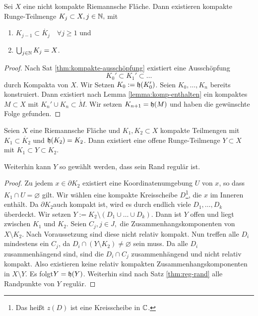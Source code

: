 \begin{cor}
  \label{cor:ausschöpfung-kompakt}
  Sei $X$ eine nicht kompakte Riemannsche Fläche. Dann existieren
  kompakte Runge-Teilmenge $K_j \subset X, j \in \mathbb{N},$ mit
  \begin{enumerate}
  \item $K_{j-1} \subset \mathring{K_j} \quad \forall j \geq 1$ und
  \item $\bigcup_{j\in \mathbb{N}} K_j = X$.
  \end{enumerate}
\end{cor}

\begin{proof}
  Nach Sat \ref{thm:kompakte-ausschöpfung} existiert eine 
  Ausschöpfung
  \[
  K_0' \subset K_1' \subset \dots
  \]
  durch Kompakta von $X$. Wir Setzen $K_0 := \mathfrak{h}(K_0')$. Seien
  $K_0, \dots, K_n$ bereits konstruiert. Dann existiert nach Lemma
  \ref{lemma:komp-enthalten} ein
  kompaktes $M \subset X$ mit $K_n' \cup K_n \subset \mathring
  M$. Wir setzen $K_{n+1} = \mathfrak{h}(M)$ und haben die gewünschte Folge
  gefunden.
\end{proof}

\begin{lemma}
  \label{lemma:zwischen-runge}
  Seien $X$ eine Riemannsche Fläche und $K_1, K_2 \subset X$ kompakte
  Teilmengen mit $K_1 \subset \mathring{K_2}$ und $\mathfrak{h}(K_2) =
  K_2$. Dann existiert eine offene Runge-Teilmenge $Y \subset X$ mit
  $K_1 \subset Y \subset K_2$.

  Weiterhin kann $Y$ so gewählt werden, dass sein Rand regulär ist.
\end{lemma}

\begin{proof}
  Zu jedem $x \in \partial K_2$ existiert eine Koordinatenumgebung $U$
  von $x$, so dass \break$K_1 \cap U = \varnothing$ gilt. Wir wählen eine kompakte
  Kreisscheibe $D$\footnote{Das heißt $z(D)$ ist eine Kreisscheibe in
    $\mathbb{C}$.}, die $x$ im Inneren enthält. Da $\partial K_2$auch
  kompakt ist, wird es durch endlich viele $D_1, \dots, D_k$
  überdeckt. Wir setzen $Y := K_2 \setminus (D_1 \cup \dots \cup D_k)$. 
  Dann ist $Y$ offen und liegt zwischen $K_1$ und $K_2$. 
  Seien $C_j, j \in J,$ die Zusammenhangskomponenten von $X \setminus
  K_2$. Nach Voraussetzung sind diese nicht relativ kompakt. Nun
  treffen alle $D_i$ mindestens ein $C_j$, da $D_i \cap (Y \setminus
  K_2) \neq \varnothing$ sein muss. Da alle $D_i$ zusammenhängend
  sind, sind die $D_i \cap C_j$ zusammenhängend und nicht relativ
  kompakt. Also existieren keine relativ kompakten
  Zusammenhangskomponenten in $X\setminus Y$. Es folgt$Y = \mathfrak{h}(Y)$.
  Weiterhin sind nach Satz \ref{thm:reg-rand} alle Randpunkte von $Y$ regulär.
\end{proof}


